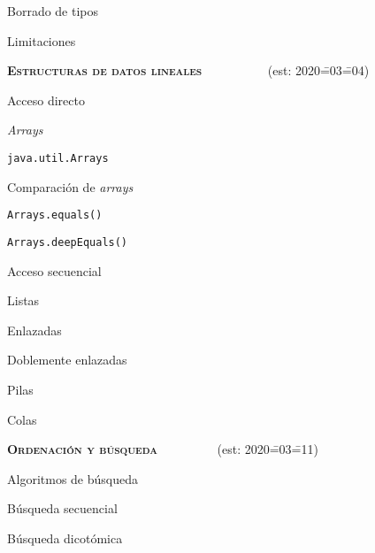 \begin{longenum}
\begin{longenum}
        \item Borrado de tipos
        \item Limitaciones
    \end{longenum}
    \item \textbf{\textsc{Estructuras de datos lineales}} \ \ \ \ \ \ \ \ \ \ (est: 2020\==03\==04)
    \begin{longenum}
        \item Acceso directo
        \begin{longenum}
            \item \textit{Arrays}
            \item \texttt{java.util.Arrays}
            \begin{longenum}
                \item Comparación de \textit{arrays}
                \begin{longenum}
                    \item \texttt{Arrays.equals()}
                    \item \texttt{Arrays.deepEquals()}
                \end{longenum}
            \end{longenum}
        \end{longenum}
        \item Acceso secuencial
        \begin{longenum}
            \item Listas
            \begin{longenum}
                \item Enlazadas
                \item Doblemente enlazadas
            \end{longenum}
            \item Pilas
            \item Colas
        \end{longenum}
    \end{longenum}
    \item \textbf{\textsc{Ordenación y búsqueda}} \ \ \ \ \ \ \ \ \ (est: 2020\==03\==11)
    \begin{longenum}
        \item Algoritmos de búsqueda
        \begin{longenum}
            \item Búsqueda secuencial
            \item Búsqueda dicotómica

\end{longenum}
\end{longenum}
\end{longenum}
